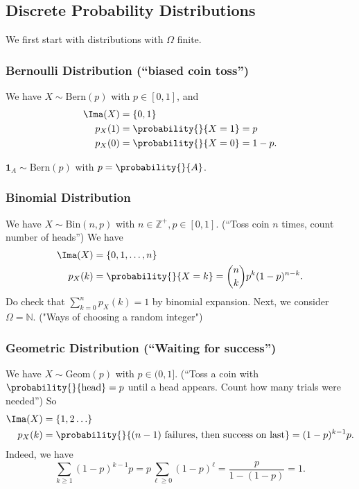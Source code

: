 \subsection{Discrete Probability Distributions}
We first start with distributions with \(\Omega\) finite.
\subsubsection{Bernoulli Distribution (``biased coin toss'')}
We have \(X \sim \mathrm{Bern}(p)\) with \(p \in [0,1]\), and
\begin{align*}
    \Ima(X) &= \{0,1\}\\
    p_X(1) &= \probability{}{X = 1} = p\\
    p_X(0) &= \probability{}{X = 0} = 1-p.
\end{align*}
\begin{example}
    \(\textbf{1}_A \sim \mathrm{Bern}(p)\) with \(p = \probability{}{A}\).
\end{example}
\subsubsection{Binomial Distribution}
We have \(X \sim \mathrm{Bin}(n,p)\) with \(n \in \mathbb{Z}^+, p \in [0,1]\). (``Toss coin \(n\) times, count number of heads'') We have
\begin{align*}
    \Ima(X) &= \{0,1, \ldots, n\}\\
    p_X(k) &= \probability{}{X = k} = \binom{n}{k}p^k (1-p)^{n-k}.
\end{align*}
Do check that \(\sum\limits_{k=0}^{n} p_X(k) = 1\) by binomial expansion.
Next, we consider \(\Omega=\mathbb{N}\). ("Ways of choosing a random integer")
\subsubsection{Geometric Distribution (``Waiting for success'')}
We have \(X \sim \mathrm{Geom}(p)\) with \(p \in (0,1]\). (``Toss a coin with \(\probability{}{\text{head}} =p\) until a head appears. Count how many trials were needed'') So
\begin{align*}
    \Ima(X) &= \{1,2 \ldots\}\\
    p_X(k) &= \probability{}{(n-1)\text{ failures, then success on last}} = (1-p)^{k-1}p. 
\end{align*}
Indeed, we have
\[
    \sum\limits_{k\geq 1}(1-p)^{k-1}p = p \sum_{\ell\geq 0}(1-p)^\ell = \frac{p}{1 - (1-p)} = 1.
\]

